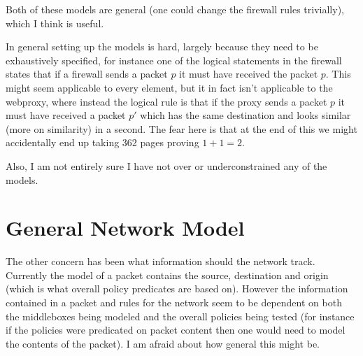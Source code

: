 \documentclass[11pt]{article}
\begin{document}
Both of these models are general (one could change the firewall rules trivially), which I think is useful.

In general setting up the models is hard, largely because they need to be exhaustively specified, for instance one of
the logical statements in the firewall states that if a firewall sends a packet $p$ it must have received the packet
$p$.
This might seem applicable to every element, but it in fact isn't applicable to the webproxy, where instead the logical
rule is that if the proxy sends a packet $p$ it must have received a packet $p'$ which has the same destination and
looks similar (more on similarity) in a second. The fear here is that at the end of this we might accidentally end up
taking 362 pages proving $1 + 1 = 2$.

Also, I am not entirely sure I have not over or underconstrained any of the models.

\section{General Network Model}
The other concern has been what information should the network track. Currently the model of a packet contains the
source, destination and origin (which is what overall policy predicates are based on). However the information contained
in a packet and rules for the network seem to be dependent on both the middleboxes being modeled and the overall policies being
tested (for instance if the policies were predicated on packet content then one would need to model the contents of the
packet). I am afraid about how general this might be.
\end{document}
